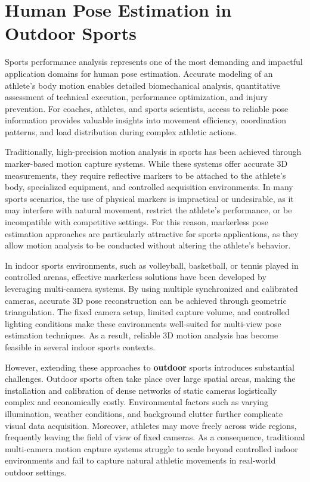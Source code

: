 \section{Human Pose Estimation in Outdoor Sports}

Sports performance analysis represents one of the most demanding and impactful application domains for human pose estimation.
Accurate modeling of an athlete's body motion enables detailed biomechanical analysis, quantitative assessment of technical execution, performance optimization, and injury prevention.
For coaches, athletes, and sports scientists, access to reliable pose information provides valuable insights into movement efficiency, coordination patterns, and load distribution during complex athletic actions.

Traditionally, high-precision motion analysis in sports has been achieved through marker-based motion capture systems.
While these systems offer accurate 3D measurements, they require reflective markers to be attached to the athlete's body, specialized equipment, and controlled acquisition environments.
In many sports scenarios, the use of physical markers is impractical or undesirable, as it may interfere with natural movement, restrict the athlete's performance, or be incompatible with competitive settings.
For this reason, markerless pose estimation approaches are particularly attractive for sports applications, as they allow motion analysis to be conducted without altering the athlete's behavior.

In indoor sports environments, such as volleyball, basketball, or tennis played in controlled arenas, effective markerless solutions have been developed by leveraging multi-camera systems.
By using multiple synchronized and calibrated cameras, accurate 3D pose reconstruction can be achieved through geometric triangulation.
The fixed camera setup, limited capture volume, and controlled lighting conditions make these environments well-suited for multi-view pose estimation techniques.
As a result, reliable 3D motion analysis has become feasible in several indoor sports contexts.

However, extending these approaches to \textbf{outdoor} sports introduces substantial challenges.
Outdoor sports often take place over large spatial areas, making the installation and calibration of dense networks of static cameras logistically complex and economically costly.
Environmental factors such as varying illumination, weather conditions, and background clutter further complicate visual data acquisition.
Moreover, athletes may move freely across wide regions, frequently leaving the field of view of fixed cameras.
As a consequence, traditional multi-camera motion capture systems struggle to scale beyond controlled indoor environments and fail to capture natural athletic movements in real-world outdoor settings.

